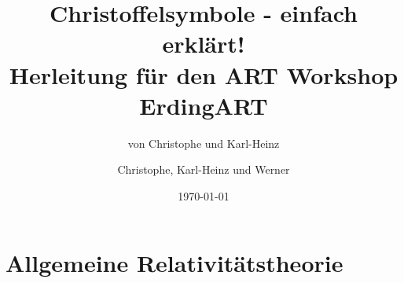 \documentclass[11pt,a4paper]{article}
\title{Christoffelsymbole - einfach erklärt! \\
      Herleitung für den ART Workshop Erding}
\author{von Christophe und Karl-Heinz}
\date{\today}
\begin{document}
	\title{ART}
	
	\author{Christophe, Karl-Heinz und Werner}
	
	\maketitle

\tableofcontents{}
	\cleardoublepage
	
	
	\part{Allgemeine Relativitätstheorie}
	  
	  
	  
	  
	  
	  
	  
	  
	
	\markboth{}{}
    
    
  
\end{document}
